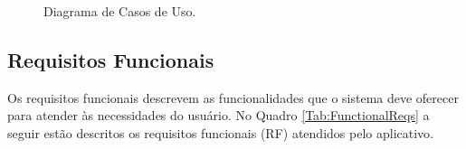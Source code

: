 \begin{figure}[H]
    \centering
    \caption{Diagrama de Casos de Uso.}
    \label{fig:UseCasesDiagram}
\end{figure}

\subsection{Requisitos Funcionais}
Os requisitos funcionais descrevem as funcionalidades que o sistema deve oferecer para atender às necessidades do usuário. No Quadro \ref{Tab:FunctionalReqs} a seguir estão descritos os requisitos funcionais (RF) atendidos pelo aplicativo.

